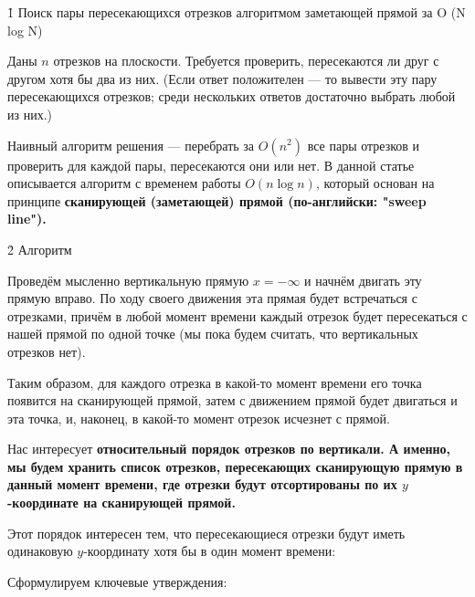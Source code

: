 \h1{ Поиск пары пересекающихся отрезков алгоритмом заметающей прямой за O (N log N) }

Даны $n$ отрезков на плоскости. Требуется проверить, пересекаются ли друг с другом хотя бы два из них. (Если ответ положителен --- то вывести эту пару пересекающихся отрезков; среди нескольких ответов достаточно выбрать любой из них.)

Наивный алгоритм решения --- перебрать за $O (n^2)$ все пары отрезков и проверить для каждой пары, пересекаются они или нет. В данной статье описывается алгоритм с временем работы $O (n \log n)$, который основан на принципе \bf{сканирующей (заметающей) прямой} (по-английски: "sweep line").


\h2{ Алгоритм }

Проведём мысленно вертикальную прямую $x = -\infty$ и начнём двигать эту прямую вправо. По ходу своего движения эта прямая будет встречаться с отрезками, причём в любой момент времени каждый отрезок будет пересекаться с нашей прямой по одной точке (мы пока будем считать, что вертикальных отрезков нет).


Таким образом, для каждого отрезка в какой-то момент времени его точка появится на сканирующей прямой, затем с движением прямой будет двигаться и эта точка, и, наконец, в какой-то момент отрезок исчезнет с прямой.

Нас интересует \bf{относительный порядок отрезков} по вертикали. А именно, мы будем хранить список отрезков, пересекающих сканирующую прямую в данный момент времени, где отрезки будут отсортированы по их $y$-координате на сканирующей прямой.


Этот порядок интересен тем, что пересекающиеся отрезки будут иметь одинаковую $y$-координату хотя бы в один момент времени:


Сформулируем ключевые утверждения:

